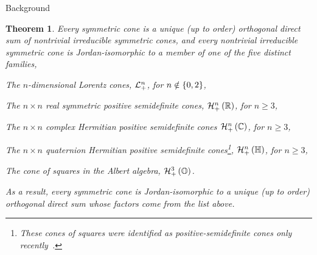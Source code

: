 \documentclass{interact}
\theoremstyle{plain}
\newtheorem{theorem}{Theorem}[section]
\theoremstyle{definition}
\theoremstyle{remark}
\begin{document}
\begin{section}{Background}
    \begin{theorem}\label{thm:direct sum decomposition}
      Every symmetric cone is a unique (up to order) orthogonal direct
      sum of nontrivial irreducible symmetric cones, and every
      nontrivial irreducible symmetric cone is Jordan-isomorphic to a
      member of one of the five distinct families,
      \begin{enumerate}
        \begin{item}
          The $n$-dimensional Lorentz cones, $\Lnplus$, for $n \notin
          \set{0,2}$,
        \end{item}
        \begin{item}
          The $n \times n$ real symmetric positive semidefinite cones,
          $\Hnplus\of{\Rn[1]}$, for $n \ge 3$,
        \end{item}
        \begin{item}
          The $n \times n$ complex Hermitian positive semidefinite
          cones $\Hnplus\of{\Cn[1]}$, for $n \ge 3$,
        \end{item}
        \begin{item}
          The $n \times n$ quaternion Hermitian positive semidefinite
          cones\footnote{These cones of squares were identified as
          positive-semidefinite cones only
          recently~\cite{orlitzky_-_jordan_automorphisms}.},
          $\Hnplus\of{\quaternions}$, for $n \ge 3$,
        \end{item}
        \begin{item}
          The cone of squares in the Albert algebra,
          $\Hnplus[3]\of{\octonions}$.
        \end{item}
      \end{enumerate}
      As a result, every symmetric cone is Jordan-isomorphic to a
      unique (up to order) orthogonal direct sum whose factors come
      from the list above.
    \end{theorem}


\end{section}
\end{document}
